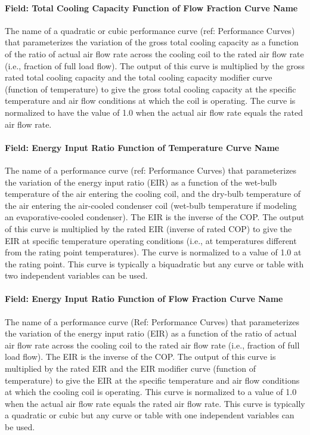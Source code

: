 \paragraph{Field: Total Cooling Capacity Function of Flow Fraction Curve Name}\label{field-total-cooling-capacity-function-of-flow-fraction-curve-name}

The name of a quadratic or cubic performance curve (ref: Performance Curves) that parameterizes the variation of the gross total cooling capacity as a function of the ratio of actual air flow rate across the cooling coil to the rated air flow rate (i.e., fraction of full load flow). The output of this curve is multiplied by the gross rated total cooling capacity and the total cooling capacity modifier curve (function of temperature) to give the gross total cooling capacity at the specific temperature and air flow conditions at which the coil is operating. The curve is normalized to have the value of 1.0 when the actual air flow rate equals the rated air flow rate.

\paragraph{Field: Energy Input Ratio Function of Temperature Curve Name}\label{field-energy-input-ratio-function-of-temperature-curve-name}

The name of a performance curve (ref: Performance Curves) that parameterizes the variation of the energy input ratio (EIR) as a function of the wet-bulb temperature of the air entering the cooling coil, and the dry-bulb temperature of the air entering the air-cooled condenser coil (wet-bulb temperature if modeling an evaporative-cooled condenser). The EIR is the inverse of the COP. The output of this curve is multiplied by the rated EIR (inverse of rated COP) to give the EIR at specific temperature operating conditions (i.e., at temperatures different from the rating point temperatures). The curve is normalized to a value of 1.0 at the rating point. This curve is typically a biquadratic but any curve or table with two independent variables can be used.

\paragraph{Field: Energy Input Ratio Function of Flow Fraction Curve Name}\label{field-energy-input-ratio-function-of-flow-fraction-curve-name}

The name of a performance curve (Ref: Performance Curves) that parameterizes the variation of the energy input ratio (EIR) as a function of the ratio of actual air flow rate across the cooling coil to the rated air flow rate (i.e., fraction of full load flow). The EIR is the inverse of the COP. The output of this curve is multiplied by the rated EIR and the EIR modifier curve (function of temperature) to give the EIR at the specific temperature and air flow conditions at which the cooling coil is operating. This curve is normalized to a value of 1.0 when the actual air flow rate equals the rated air flow rate. This curve is typically a quadratic or cubic but any curve or table with one independent variables can be used.

